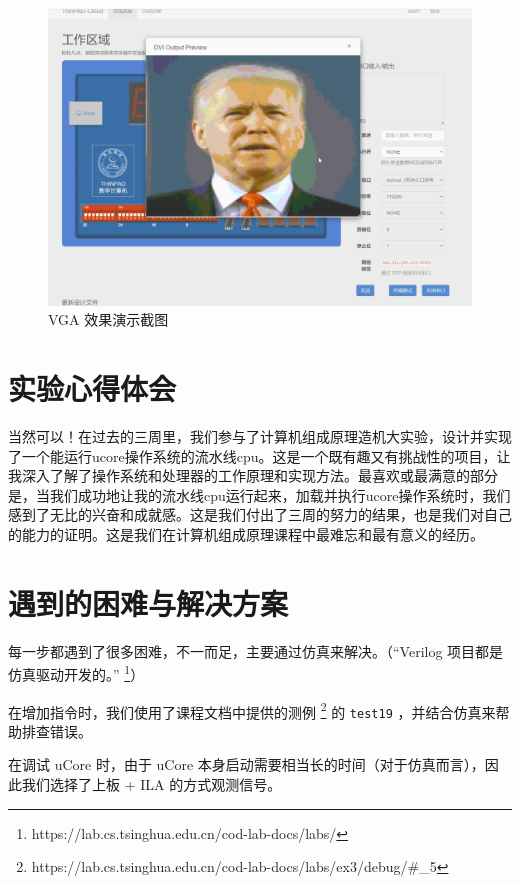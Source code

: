 \documentclass[12pt,a4paper,oneside]{ctexart}
\begin{document}
\begin{figure}[H]
    \centering
    \includegraphics[scale=0.25]{assets/VGAdemo.png}
    \caption{VGA 效果演示截图}
    \label{fig:VGAdemo}
\end{figure}

\section{实验心得体会}
当然可以！在过去的三周里，我们参与了计算机组成原理造机大实验，设计并实现了一个能运行ucore操作系统的流水线cpu。这是一个既有趣又有挑战性的项目，让我深入了解了操作系统和处理器的工作原理和实现方法。最喜欢或最满意的部分是，当我们成功地让我的流水线cpu运行起来，加载并执行ucore操作系统时，我们感到了无比的兴奋和成就感。这是我们付出了三周的努力的结果，也是我们对自己的能力的证明。这是我们在计算机组成原理课程中最难忘和最有意义的经历。 %


\section{遇到的困难与解决方案}
每一步都遇到了很多困难，不一而足，主要通过仿真来解决。（“Verilog 项目都是仿真驱动开发的。” \footnote{https://lab.cs.tsinghua.edu.cn/cod-lab-docs/labs/}）%

在增加指令时，我们使用了课程文档中提供的测例 \footnote{https://lab.cs.tsinghua.edu.cn/cod-lab-docs/labs/ex3/debug/#_5} 的 \texttt{test19} ，并结合仿真来帮助排查错误。

在调试 uCore 时，由于 uCore 本身启动需要相当长的时间（对于仿真而言），因此我们选择了上板 + ILA 的方式观测信号。
\end{document}

